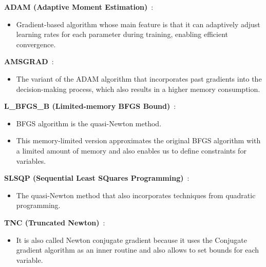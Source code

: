 \textbf{ADAM (Adaptive Moment Estimation)}~\cite{adam}:
\begin{itemize}
    \item Gradient-based algorithm whose main feature is that it can adaptively adjust learning rates for each parameter during training, enabling efficient convergence.
\end{itemize}
\textbf{AMSGRAD}~\cite{amsgrad}:
\begin{itemize}
    \item The variant of the ADAM algorithm that incorporates past gradients into the decision-making process, which also results in a higher memory consumption.
\end{itemize}
\textbf{L\_BFGS\_B (Limited-memory BFGS Bound)}~\cite{lbfgsb}:
\begin{itemize}
    \item BFGS algorithm is the quasi-Newton method.
    \item This memory-limited version approximates the original BFGS algorithm with a limited amount of memory and also enables us to define constraints for variables.
\end{itemize}
\textbf{SLSQP (Sequential Least SQuares Programming)}~\cite{slsqp}:
\begin{itemize}
    \item The quasi-Newton method that also incorporates techniques from quadratic programming.
\end{itemize}
\textbf{TNC (Truncated Newton)}~\cite{tnc}:
\begin{itemize}
    \item It is also called Newton conjugate gradient because it uses the Conjugate gradient algorithm as an inner routine and also allows to set bounds for each variable.
\end{itemize}

